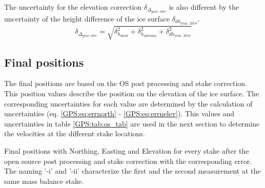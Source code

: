 The uncertainty for the elevation correction $\delta_{\Delta_{year, \text{elev}}}$ is also different by the uncertainty of the height difference of the ice surface $\delta_{dh_{\text{year, 2018}}}$.
\begin{equation}
	\delta_{\Delta_{year, \text{elev}}} = \sqrt{\delta_{h_{\text{snow}}}^2 + \delta_{h_{\text{antenna}}}^2 + \delta_{dh_{\text{year, 2018}}}^2}
\end{equation}

\subsection{Final positions}

The final positions are based on the OS post processing and stake correction.
This position values describe the position on the elevation of the ice surface. 
The corresponding uncertainties for each value are determined by the calculation of uncertainties (eq. \ref{GPS:eq:errnorth} - \ref{GPS:eq:errnelev}). 
This values and uncertainties in table \ref{GPS:tab:os_tab} are used in the next section to determine the velocities at the different stake locations. 

\begin{table}[H]
	\caption{Final positions with Northing, Easting and Elevation for every stake after the open source post processing and stake correction with the corresponding error. The naming '-i' and '-ii' characterize the first and the second measurement at the same mass balance stake.}
	\centering
	
	\label{GPS:tab:os_tab}
\end{table}
